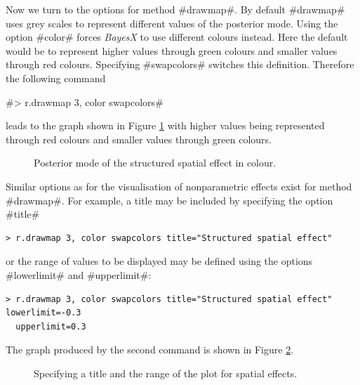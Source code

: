 \documentclass{article}
\begin{document}
Now we turn to the options for method #drawmap#. By default
#drawmap# uses grey scales to represent different values of the
posterior mode. Using the option #color# forces {\it BayesX} to
use different colours instead. Here the default would be to
represent higher values through green colours and smaller values
through red colours. Specifying #swapcolors# switches this
definition. Therefore the following command

#> r.drawmap 3, color swapcolors#

leads to the graph shown in Figure \ref{spat3} with higher values
being represented through red colours and smaller values through
green colours.

\begin{figure}[ht]
\begin{center}
{\it\caption{Posterior mode of the structured spatial effect in
colour.\label{spat3}}}
\end{center}
\end{figure}


Similar options as for the visualisation of nonparametric effects
exist for method #drawmap#. For example, a title may be included
by specifying the option #title#

\begin{verbatim}
> r.drawmap 3, color swapcolors title="Structured spatial effect"
\end{verbatim}

or the range of values to be displayed may be defined using the
options #lowerlimit# and #upperlimit#:

\begin{verbatim}
> r.drawmap 3, color swapcolors title="Structured spatial effect" lowerlimit=-0.3
  upperlimit=0.3
\end{verbatim}

The graph produced by the second command is shown in Figure
\ref{spat4}.

\begin{figure}[ht]
\begin{center}
{\it\caption{Specifying a title and the range of the plot for
spatial effects.\label{spat4}}}
\end{center}
\end{figure}

\end{document}
